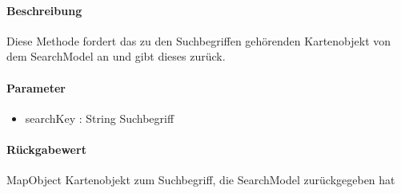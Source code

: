 \paragraph*{Beschreibung}
Diese Methode fordert das zu den Suchbegriffen gehörenden Kartenobjekt von dem SearchModel an und gibt dieses zurück.
\paragraph*{Parameter}
\begin{itemize}
    \item searchKey : String Suchbegriff
\end{itemize}
\paragraph*{Rückgabewert}
MapObject Kartenobjekt zum Suchbegriff, die SearchModel zurückgegeben hat